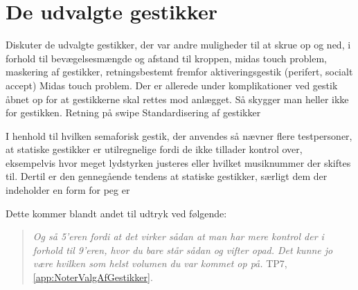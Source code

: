 \section{De udvalgte gestikker}
\label{DiskussionUdvalgteGestikker}
%
Diskuter de udvalgte gestikker, der var andre muligheder til at skrue op og ned, i forhold til bevægelsesmængde og afstand til kroppen, midas touch problem, maskering af gestikker, retningsbestemt fremfor aktiveringsgestik (perifert, socialt accept)\blankline
%
Midas touch problem. Der er allerede under komplikationer ved gestik åbnet op for at gestikkerne skal rettes mod anlægget. Så skygger man heller ikke for gestikken.\blankline
%
Retning på swipe\blankline
%
Standardisering af gestikker
%


I henhold til hvilken semaforisk gestik, der anvendes så nævner flere testpersoner, at statiske gestikker er utilregnelige fordi de ikke tillader kontrol over, eksempelvis hvor meget lydstyrken justeres eller hvilket musiknummer der skiftes til. Dertil er den gennegående tendens at statiske gestikker, særligt dem der indeholder en form for peg er  


 Dette kommer blandt andet til udtryk ved følgende: 
%
\begin{quotation}
	\noindent
	\textit{Og så 5'eren fordi at det virker sådan at man har mere kontrol der i forhold til 9'eren, hvor du bare står sådan og vifter opad. Det kunne jo være hvilken som helst volumen du var kommet op på.} TP7, \autoref{app:NoterValgAfGestikker}.
\noindent
\end{quotation}
%
